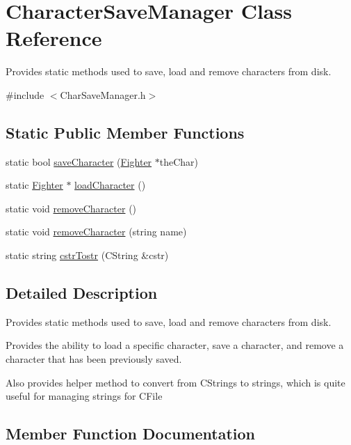 \hypertarget{class_character_save_manager}{}\section{Character\+Save\+Manager Class Reference}
\label{class_character_save_manager}


Provides static methods used to save, load and remove characters from disk.  




{\ttfamily \#include $<$Char\+Save\+Manager.\+h$>$}

\subsection*{Static Public Member Functions}
\begin{DoxyCompactItemize}
\item 
static bool \hyperlink{class_character_save_manager_a7e4ce04eed479a22b1d3f70c9fe06652}{save\+Character} (\hyperlink{class_fighter}{Fighter} $\ast$the\+Char)
\item 
static \hyperlink{class_fighter}{Fighter} $\ast$ \hyperlink{class_character_save_manager_a44105e8553b29cd7e37f3eec6f1a7ce7}{load\+Character} ()
\item 
static void \hyperlink{class_character_save_manager_af8ee3fecc5c19f1f61f98e9132a26b5f}{remove\+Character} ()
\item 
static void \hyperlink{class_character_save_manager_a49dd1eedbdf0e2b7cedfba64d4fb8d53}{remove\+Character} (string name)
\item 
static string \hyperlink{class_character_save_manager_ad9adf9eda9b89e67a977167c954a8d7c}{cstr\+Tostr} (C\+String \&cstr)
\end{DoxyCompactItemize}


\subsection{Detailed Description}
Provides static methods used to save, load and remove characters from disk. 

Provides the ability to load a specific character, save a character, and remove a character that has been previously saved. 

Also provides helper method to convert from C\+Strings to strings, which is quite useful for managing strings for C\+File 

\subsection{Member Function Documentation}
\hypertarget{class_character_save_manager_ad9adf9eda9b89e67a977167c954a8d7c}{}\label{class_character_save_manager_ad9adf9eda9b89e67a977167c954a8d7c} 
